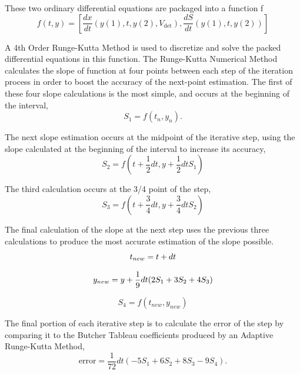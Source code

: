 \documentclass[letterpaper, twoside]{article}
\numberwithin{equation}{section}
\begin{document}
These two ordinary differential equations are packaged into a function f
\begin{equation} \label{eq: ODEpackagef}
  f(t,y) = \left[\frac{dx}{dt}\left(y(1), t, y(2), V_\mathrm{det}\right) , 
	      \frac{dS}{dt}\left(y(1), t, y(2)\right)\right]
\end{equation}

A 4th Order Runge-Kutta Method is used to discretize and solve the packed differential equations in this function. The Runge-Kutta Numerical Method calculates the slope of function at four points between each step of the iteration process in order to boost the accuracy of the next-point estimation. The first of these four slope calculations is the most simple, and occurs at the beginning of the interval,
\begin{equation} \label{eq: S_1}
  S_1 = f(t_n,y_n).
\end{equation}

The next slope estimation occurs at the midpoint of the iterative step, using the slope calculated at the beginning of the interval to increase its accuracy,
\begin{equation} \label{eq: S_2}
  S_2 = f(t + \frac{1}{2} dt,y + \frac{1}{2} dt S_1)
\end{equation}

The third calculation occurs at the 3/4  point of the step,
\begin{equation} \label{eq: S_3}
  S_3 = f(t + \frac{3}{4} dt,y+\frac{3}{4} dt S_2)
\end{equation}

The final calculation of the slope at the next step uses the previous three calculations to produce the most accurate estimation of the slope possible. 
\begin{equation} \label{eq: t_{new}}
  t_{new} = t + dt
\end{equation}

\begin{equation} \label{eq: y_{new}}
  y_{new} = y + \frac{1}{9} dt (2 S_1 + 3 S_2 + 4 S_3)
\end{equation}

\begin{equation} \label{eq: S_4}
  S_4 = f(t_{new},y_{new})
\end{equation}

The final portion of each iterative step is to calculate the error of the step by comparing it to the Butcher Tableau coefficients produced by an Adaptive Runge-Kutta Method,
\begin{equation} \label{eq: errorfunction}
  \mathrm{error} = \frac{1}{72} dt (-5 S_1 + 6 S_2 + 8 S_3 - 9 S_4).
\end{equation}
\end{document}
